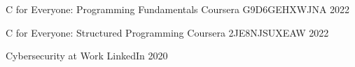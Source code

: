 

\begin{cvhonors}


  \cvhonor
    {C for Everyone: Programming Fundamentals} %
    {Coursera} %
    {G9D6GEHXWJNA} %
    {2022} %

  \cvhonor
    {C for Everyone: Structured Programming} %
    {Coursera} %
    {2JE8NJSUXEAW} %
    {2022} %

  \cvhonor
  {Cybersecurity at Work} %
  {LinkedIn} %
  {} %
  {2020} %

\end{cvhonors}
